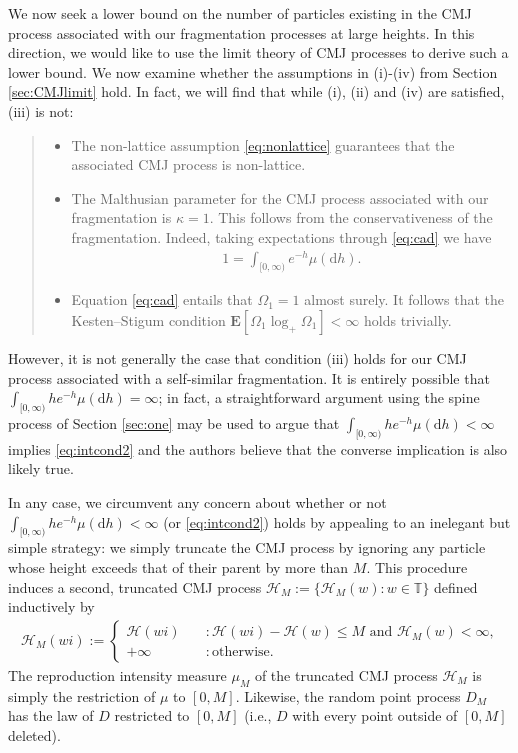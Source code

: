 \documentclass[a4,12pt]{amsart}
\numberwithin{equation}{section}
\begin{document}
	We now seek a lower bound on the number of particles existing in the 
	CMJ process associated with our fragmentation processes at large heights. 
	In this direction, we would like to use the limit theory of CMJ processes to derive such a lower bound. 
	We now examine whether the assumptions in (i)-(iv) from Section \ref{sec:CMJlimit} hold. 
	In fact, we will find that while (i), (ii) and (iv) are satisfied, (iii) is not:
\begin{quote}
\normalsize
	\begin{itemize}
		\item[(i)] 	The non-lattice assumption \eqref{eq:nonlattice} guarantees that the associated CMJ process is non-lattice.
        \item[(ii)] The Malthusian parameter for the CMJ process associated with our fragmentation is $\kappa=1$. This follows from the conservativeness of the fragmentation. Indeed, taking expectations through \eqref{eq:cad} we have
        	\begin{align} \label{eq:cad2}
		1 = \int_{ [0,\infty) } e^{-h} \mu(\mathrm{d}h).
	\end{align}
    \item[(iv)] Equation \eqref{eq:cad} entails that $\Omega_1 = 1$ almost surely. It follows that the Kesten--Stigum condition $\mathbf{E}[ \Omega_1 \log_+ \Omega_1 ] < \infty$ holds trivially.
	\end{itemize}
    \end{quote}
However, it is not generally the case that condition (iii) holds for our CMJ process associated with a self-similar fragmentation. It is entirely possible that $\int_{[0,\infty)} he^{ - h} \mu(\mathrm{d}h) = \infty$; in fact, a straightforward argument using the spine process of Section \ref{sec:one} may be used to argue that $\int_{[0,\infty)} he^{-h} \mu(\mathrm{d}h) < \infty$ implies \eqref{eq:intcond2} and the authors believe that the converse implication is also likely true.

	In any case, we circumvent any concern about whether or not $\int_{[0,\infty)}he^{-h} \mu(\mathrm{d}h) < \infty$ 
	(or \eqref{eq:intcond2}) holds by appealing to an inelegant but simple strategy: 
	we simply truncate the CMJ process by ignoring any particle whose height exceeds that of their parent by more than $M$.  
	This procedure induces a second, truncated CMJ process 
	$\mathcal{H}_M := \{\mathcal{H}_M(w) : w \in \mathbb{T} \}$ defined inductively by 
	\begin{align*} 
	\mathcal{H}_M(wi) :=
	\begin{cases}
	\mathcal{H}(wi) \quad &: \text{$\mathcal{H}(wi) - \mathcal{H}(w) \leq M$ and $\mathcal{H}_M(w) < \infty$,}\\
	+ \infty \quad &: \text{otherwise}.%
	\end{cases}
	\end{align*} 
    	The reproduction intensity measure $\mu_M$ of the truncated CMJ process $\mathcal{H}_M$ 
	is simply the restriction of $\mu$ to $[0,M]$. Likewise, the random point process $D_M$ has the law of $D$ 
    	restricted to $[0,M]$ (i.e., $D$ with every point outside of $[0,M]$ deleted). 
\end{document}
